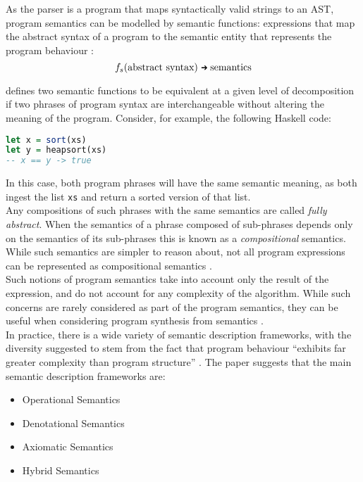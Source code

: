 As the parser is a program that maps syntactically valid strings to an AST, program semantics can be modelled by semantic functions: expressions that map the abstract syntax of a program to the semantic entity that represents the program behaviour \citep{mosses1992action}:
\begin{equation*}
    f_s(\text{abstract syntax}) \mathgoesto \text{semantics}
\end{equation*}

\citet{mosses1992action} defines two semantic functions to be equivalent at a given level of decomposition if two phrases of program syntax are interchangeable without altering the meaning of the program. 
Consider, for example, the following Haskell code:
\begin{lstlisting}[language=haskell]
let x = sort(xs)
let y = heapsort(xs)
-- x == y -> true
\end{lstlisting}
In this case, both program phrases will have the same semantic meaning, as both ingest the list \lstinline[language=haskell]{xs} and return a sorted version of that list.\\

Any compositions of such phrases with the same semantics are called \textit{fully abstract}. 
When the semantics of a phrase composed of sub-phrases depends only on the semantics of its sub-phrases this is known as a \textit{compositional} semantics. 
While such semantics are simpler to reason about, not all program expressions can be represented as compositional semantics \citep{mosses1992action}.\\

Such notions of program semantics take into account only the result of the expression, and do not account for any complexity of the algorithm.
While such concerns are rarely considered as part of the program semantics, they can be useful when considering program synthesis from semantics \citep{kanovich1991efficient}.\\

In practice, there is a wide variety of semantic description frameworks, with the diversity suggested to stem from the fact that program behaviour ``exhibits far greater complexity than program structure'' \citep[pg. 14]{Zhang:2004:SSD:981009.981013}.
The paper suggests that the main semantic description frameworks are:
\begin{itemize}
    \item Operational Semantics
    \item Denotational Semantics
    \item Axiomatic Semantics
    \item Hybrid Semantics
\end{itemize}

